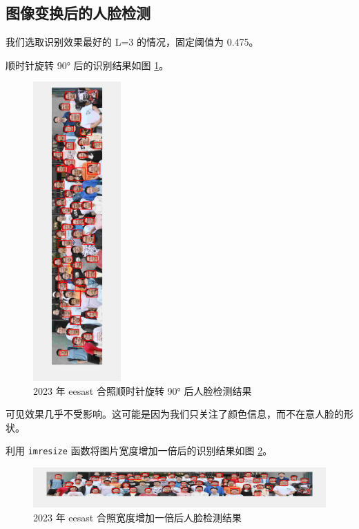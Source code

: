 \documentclass[a4paper]{article}  %
\begin{document}
\subsection{图像变换后的人脸检测}

我们选取识别效果最好的 L=3 的情况，固定阈值为 0.475。

顺时针旋转 90° 后的识别结果如图 \ref{fig:4_3_eesast_2_L3}。

\begin{figure}[ht]
    \centering
    \includegraphics[width=0.3\textwidth]{asserts/4_3_eesast_2_L3.png}
    \caption{
        2023 年 eesast 合照顺时针旋转 90° 后人脸检测结果
    }\label{fig:4_3_eesast_2_L3}
\end{figure}

可见效果几乎不受影响。这可能是因为我们只关注了颜色信息，而不在意人脸的形状。

利用 \texttt{imresize} 函数将图片宽度增加一倍后的识别结果如图 \ref{fig:4_3_eesast_3_L3}。

\begin{figure}[ht]
    \centering
    \includegraphics[width=1.0\textwidth]{asserts/4_3_eesast_3_L3.png}
    \caption{
        2023 年 eesast 合照宽度增加一倍后人脸检测结果
    }\label{fig:4_3_eesast_3_L3}
\end{figure}
\end{document}
